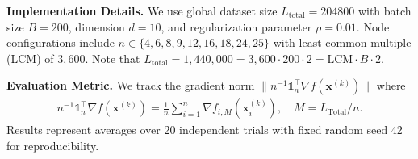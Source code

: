 \documentclass[10pt]{article}
\newcommand{\one}{\mathds{1}_n}
\newcommand{\vx}{{\mathbf{x}}}
\begin{document}
\textbf{Implementation Details.} We use global dataset size $L_{\text{total}}=204800$ with batch size $B = 200$, dimension $d=10$, and regularization parameter $\rho=0.01$. Node configurations include $n \in \{4,6,8,9,12,16,18,24,25\}$ with least common multiple (LCM) of $3,600$. Note that $L_{\text{total}}=1,440,000=3,600\cdot200\cdot2=\text{LCM}\cdot B \cdot 2$.

\textbf{Evaluation Metric.} We track the gradient norm $\|n^{-1}\one^\top \nabla f(\vx^{(k)})\|$ where
\begin{align*}
    n^{-1}\one^\top \nabla f(\vx^{(k)}) = \frac{1}{n}\sum_{i=1}^n \nabla f_{i,M}(\bm{x}_i^{(k)}), \quad M=L_{\text{Total}}/n.
\end{align*}
Results represent averages over 20 independent trials with fixed random seed 42 for reproducibility.




\end{document}
